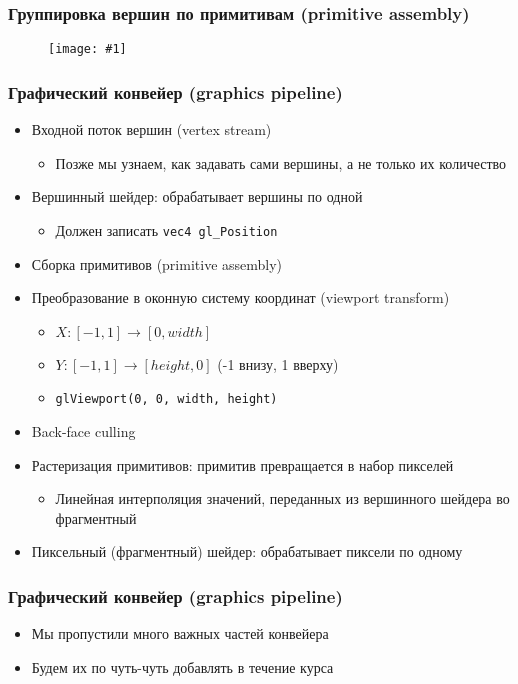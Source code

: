 \documentclass{beamer}
\newcommand{\slideimage}[1]{
  \begin{figure}
    \begin{adjustbox}{width=\textwidth, totalheight=\textheight-2\baselineskip-2\baselineskip,keepaspectratio}
      \texttt{[image: \#1]}
    \end{adjustbox}
  \end{figure}
}
\begin{document}

\begin{frame}
\frametitle{Группировка вершин по примитивам (primitive assembly)}
\slideimage{primitives.png}
\end{frame}

\begin{frame}[fragile]
\frametitle{Графический конвейер (graphics pipeline)}
\begin{itemize}
\pause
\item Входной поток вершин (vertex stream)
\begin{itemize}
\item Позже мы узнаем, как задавать сами вершины, а не только их количество
\end{itemize}
\pause
\item Вершинный шейдер: обрабатывает вершины по одной
\begin{itemize}
\item Должен записать \verb|vec4 gl_Position|
\end{itemize}
\pause
\item Сборка примитивов (primitive assembly)
\pause
\item Преобразование в оконную систему координат (viewport transform)
\begin{itemize}
\item \begin{math}X: [-1, 1] \rightarrow [0, width]\end{math}
\item \begin{math}Y: [-1, 1] \rightarrow [height, 0]\end{math} (-1 внизу, 1 вверху)
\item \verb|glViewport(0, 0, width, height)|
\end{itemize}
\pause
\item Back-face culling
\pause
\item Растеризация примитивов: примитив превращается в набор пикселей
\begin{itemize}
\item Линейная интерполяция значений, переданных из вершинного шейдера во фрагментный
\end{itemize}
\pause
\item Пиксельный (фрагментный) шейдер: обрабатывает пиксели по одному
\end{itemize}
\end{frame}

\begin{frame}[fragile]
\frametitle{Графический конвейер (graphics pipeline)}
\begin{itemize}
\item Мы пропустили много важных частей конвейера
\item Будем их по чуть-чуть добавлять в течение курса
\end{itemize}
\end{frame}
\end{document}
